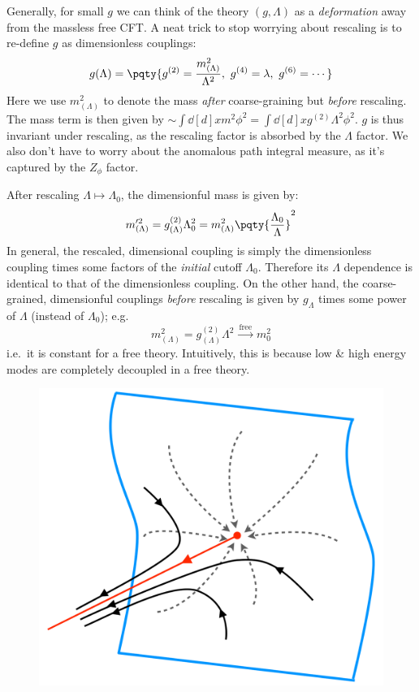 \documentclass[a4paper
	,10pt
]{article}
\begin{document}
	Generally, for small $g$ we can think of the theory $(g,\Lambda)$ as a \textit{deformation} away from the massless free CFT. A neat trick to stop worrying about rescaling is to re-define $g$ as dimensionless couplings:
	\begin{equation}
		g(\Lambda) = \pqty{
			g^{(2)} = \frac{m^2_{(\Lambda)}}{\Lambda^2},
			\ g^{(4)} = \lambda,
			\ g^{(6)} = \cdots
		}
	\end{equation}
	Here we use $m^2_{(\Lambda)}$ to denote the mass \textit{after} coarse-graining but \textit{before} rescaling. The mass term is then given by $
		\sim \int \dd[d]{x} m^2 \phi^2
		= \int \dd[d]{x} g^{(2)} \Lambda^2 \phi^2
	$. $g$ is thus invariant under rescaling, as the rescaling factor is absorbed by the $\Lambda$ factor. We also don't have to worry about the anomalous path integral measure, as it's captured by the $Z_\phi$ factor. 
	
	After rescaling $\Lambda \mapsto \Lambda_0$, the dimensionful mass is given by:
	\begin{equation}
		m'^2_{(\Lambda)}
		= g^{(2)}_{(\Lambda)} \Lambda_0^2
		= m^2_{(\Lambda)}
			\pqty{\frac{\Lambda_0}{\Lambda}}^2
	\end{equation}
	In general, the rescaled, dimensional coupling is simply the dimensionless coupling times some factors of the \textit{initial} cutoff $\Lambda_0$. Therefore its $\Lambda$ dependence is identical to that of the dimensionless coupling. On the other hand, the coarse-grained, dimensionful couplings \textit{before} rescaling is given by $g_{\Lambda}$ times some power of $\Lambda$ (instead of $\Lambda_0$); e.g.
	\begin{equation}
		m^2_{(\Lambda)}
		= g^{(2)}_{(\Lambda)} \Lambda^2
		\xrightarrow{\ \text{free}\ }
		m_0^2
	\end{equation}
	i.e.\ it is constant for a free theory. Intuitively, this is because low \& high energy modes are completely decoupled in a free theory.
	
	\begin{figure}[!h]
	\centering
	\includegraphics[width=.45\linewidth]{img/RG-flow.png}
	\end{figure}
\end{document}
